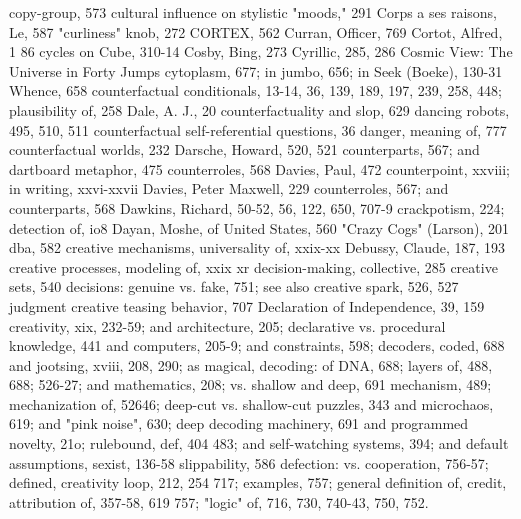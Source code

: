 copy-group, 573                                   cultural influence on stylistic "moods," 291
Corps a ses raisons, Le, 587                       "curliness" knob, 272
CORTEX, 562                                       Curran, Officer, 769
Cortot, Alfred, 1 86                              cycles on Cube, 310-14
Cosby, Bing, 273                                  Cyrillic, 285, 286
Cosmic View: The Universe in Forty Jumps          cytoplasm, 677; in jumbo, 656; in Seek
 (Boeke), 130-31                                   Whence, 658
counterfactual conditionals, 13-14, 36, 139,
 189, 197, 239, 258, 448; plausibility of, 258    Dale, A. J., 20
counterfactuality and slop, 629                   dancing robots, 495, 510, 511
counterfactual self-referential questions, 36     danger, meaning of, 777
counterfactual worlds, 232                        Darsche, Howard, 520, 521
counterparts, 567; and                            dartboard metaphor, 475
counterroles, 568                                 Davies, Paul, 472
counterpoint, xxviii; in writing, xxvi-xxvii      Davies, Peter Maxwell, 229
counterroles, 567; and counterparts, 568          Dawkins, Richard, 50-52, 56, 122, 650, 707-9
crackpotism, 224; detection of, io8               Dayan, Moshe, of United States, 560
"Crazy Cogs" (Larson), 201                        dba, 582
creative mechanisms, universality of, xxix-xx     Debussy, Claude, 187, 193
creative processes, modeling of, xxix xr          decision-making, collective, 285
creative sets, 540                                decisions: genuine vs. fake, 751; see also
creative spark, 526, 527                           judgment
creative teasing behavior, 707                    Declaration of Independence, 39, 159
creativity, xix, 232-59; and architecture, 205;    declarative vs. procedural knowledge, 441
 and computers, 205-9; and constraints, 598;      decoders, coded, 688
 and jootsing, xviii, 208, 290; as magical,       decoding: of DNA, 688; layers of, 488, 688;
 526-27; and mathematics, 208; vs.                 shallow and deep, 691
 mechanism, 489; mechanization of, 52646;         deep-cut vs. shallow-cut puzzles, 343
 and microchaos, 619; and "pink noise", 630;      deep decoding machinery, 691
 and programmed novelty, 21o; rulebound,          def, 404
 483; and self-watching systems, 394; and         default assumptions, sexist, 136-58
 slippability, 586                                defection: vs. cooperation, 756-57; defined,
creativity loop, 212, 254                          717; examples, 757; general definition of,
credit, attribution of, 357-58, 619                757; "logic" of, 716, 730, 740-43, 750, 752.
